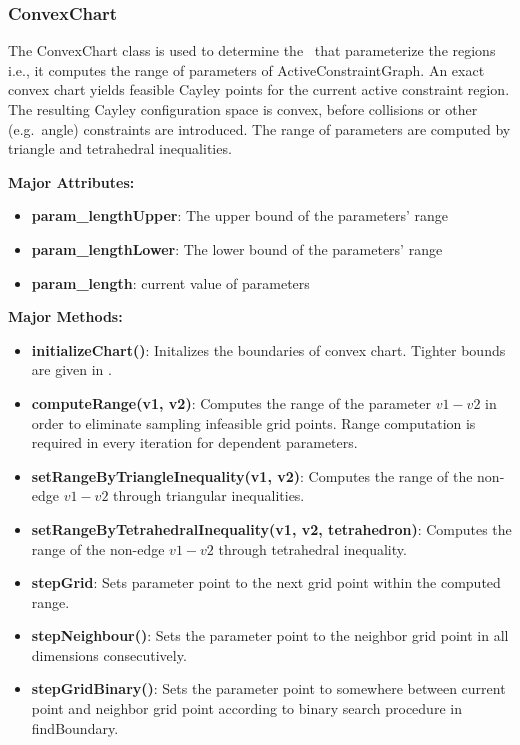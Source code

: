 \subsubsection{ConvexChart} 

The ConvexChart class is used to determine the \chart\ that parameterize the
regions i.e., it computes the range of parameters of ActiveConstraintGraph. An
exact convex chart yields feasible Cayley points for the current active
constraint region. The resulting Cayley configuration space is convex, before
collisions or other (e.g.\ angle) constraints are introduced. The range of
parameters are computed by triangle and tetrahedral inequalities.

\noindent \textbf{Major Attributes:} 
\begin{itemize}
		\item  \textbf{param\_lengthUpper}: The upper bound of the parameters' range 
		\item  \textbf{param\_lengthLower}: The lower bound of the parameters' range 
		\item  \textbf{param\_length}: current value of parameters
\end{itemize}

\noindent \textbf{Major Methods:}
\begin{itemize}
		\item  \textbf{initializeChart()}: Initalizes the boundaries of
				convex chart. Tighter bounds are given in \cite{ugandhar}. 
		\item  \textbf{computeRange(v1, v2)}: Computes the range of the
				parameter $v1-v2$ in order to eliminate sampling infeasible grid
				points. Range computation is required in every iteration for
				dependent parameters. 
		\item  \textbf{setRangeByTriangleInequality(v1, v2)}: Computes the
				range of the non-edge $v1-v2$ through triangular inequalities.
		\item  \textbf{setRangeByTetrahedralInequality(v1, v2, tetrahedron)}:
				Computes the range of the non-edge $v1-v2$ through tetrahedral
				inequality.
		\item  \textbf{stepGrid}: Sets parameter point to the next grid point
				within the computed range.
		\item  \textbf{stepNeighbour()}: Sets the parameter point to the neighbor
				grid point in all dimensions consecutively.
		\item  \textbf{stepGridBinary()}: Sets the parameter point to 
				somewhere between current point and neighbor grid point
				according to binary search procedure in findBoundary.
\end{itemize}


